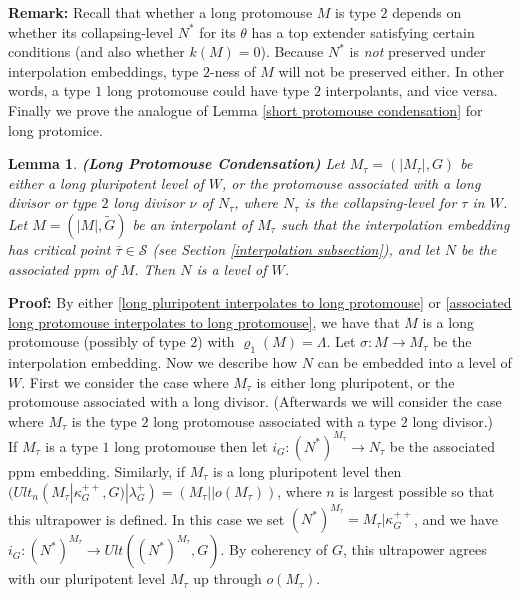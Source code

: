 \documentclass[12pt]{article}
\newtheorem{lem}[thm]{Lemma}
\begin{document}
\textbf{Remark:}  Recall that whether a long protomouse $M$ is type $2$ depends on whether its collapsing-level $N^*$ for its $\theta$ has a top extender satisfying certain conditions (and also whether $k(M) = 0$).  Because $N^*$ is \textit{not} preserved under interpolation embeddings, type $2$-ness of $M$ will not be preserved either.  In other words, a type $1$ long protomouse could have type $2$ interpolants, and vice versa.\\

Finally we prove the analogue of Lemma \ref{short protomouse condensation} for long protomice.\\




\begin{lem} \label{long protomouse condensation}
\textbf{(Long Protomouse Condensation)}
Let $M_\tau = (| M_\tau | , G)$ be either a long pluripotent level of $W$, or the protomouse associated with a long divisor or type $2$ long divisor $\nu$ of $N_\tau$, where $N_\tau$ is the collapsing-level for $\tau$ in $W$.  Let $M = (|M | , \tilde{G})$ be an interpolant of $M_\tau $ such that the interpolation embedding has critical point $\bar{\tau} \in \mathcal{S}$ (see Section \ref{interpolation subsection}), and let $N$ be the associated ppm of $M$.  Then $N$ is a level of $W$.
\end{lem}

\textbf{Proof:}  By either \ref{long pluripotent interpolates to long protomouse} or \ref{associated long protomouse interpolates to long protomouse}, we have that $M$ is a long protomouse (possibly of type $2$) with $\varrho_{1}(M) = \Lambda$.  Let $\sigma: M \longrightarrow M_\tau$ be the interpolation embedding.  Now we describe how $N$ can be embedded into a level of $W$.  First we consider the case where $M_\tau$ is either long pluripotent, or the protomouse associated with a long divisor.  (Afterwards we will consider the case where $M_\tau$ is the type $2$ long protomouse associated with a type $2$ long divisor.)\\

If $M_\tau$ is a type $1$ long protomouse then let $i_G : (N^*)^{M_\tau} \longrightarrow N_\tau$ be the associated ppm embedding.  Similarly, if $M_\tau$ is a long pluripotent level then $(Ult_n (M_\tau | \kappa_G^{++} , G) | \lambda_G^+ ) = ( M_\tau || o(M_\tau) )$, where $n$ is largest possible so that this ultrapower is defined.  In this case we set $(N^*)^{M_\tau} = M_\tau | \kappa_G^{++}$, and we have $i_G : (N^*)^{M_\tau} \longrightarrow Ult( ( N^*)^{M_\tau} , G)$.  By coherency of $G$, this ultrapower agrees with our pluripotent level $M_\tau$ up through $o(M_\tau)$.\\
\end{document}
